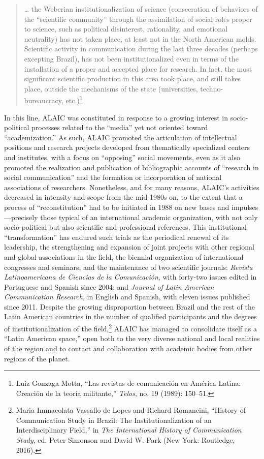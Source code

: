 \documentclass{tufte-handout}
\begin{document}
\begin{quote}
\ldots{} the Weberian institutionalization of science (consecration of
behaviors of the ``scientific community'' through the assimilation of
social roles proper to science, such as political disinterest,
rationality, and emotional neutrality) has not taken place, at least not
in the North American molds. Scientific activity in communication during
the last three decades (perhaps excepting Brazil), has not been
institutionalized even in terms of the installation of a proper and
accepted place for research. In fact, the most significant scientific
production in this area took place, and still takes place, outside the
mechanisms of the state (universities, techno-bureaucracy,
etc.)\footnote{Luiz Gonzaga Motta, ``Las revistas de comunicación en
  América Latina: Creación de la teoría militante,'' \emph{Telos}, no.
  19 (1989): 150--51.}
\end{quote}

\noindent In this line, ALAIC was constituted in response to a growing interest in
socio-political processes related to the ``media'' yet not oriented
toward ``academization.'' As such, ALAIC promoted the articulation of
intellectual positions and research projects developed from thematically
specialized centers and institutes, with a focus on ``opposing'' social
movements, even as it also promoted the realization and publication of
bibliographic accounts of ``research in social communication'' and the
formation or incorporation of national associations of researchers.
Nonetheless, and for many reasons, ALAIC's activities decreased in
intensity and scope from the mid-1980s on, to the extent that a process
of ``reconstitution'' had to be initiated in 1988 on new bases and
impulses---precisely those typical of an international academic
organization, with not only socio-political but also scientific and
professional references. This institutional ``transformation'' has
endured such trials as the periodical renewal of its leadership, the
strengthening and expansion of joint projects with other regional and
global associations in the field, the biennial organization of
international congresses and seminars, and the maintenance of two
scientific journals: \emph{Revista Latinoamericana de Ciencias de la
Comunicación}, with forty-two issues edited in Portuguese and Spanish
since 2004; and \emph{Journal of Latin American Communication Research},
in English and Spanish, with eleven issues published since 2011. Despite
the growing disproportion between Brazil and the rest of the Latin
American countries in the number of qualified participants and the
degrees of institutionalization of the field,\footnote{Maria Immacolata
  Vassallo de Lopes and Richard Romancini, ``History of Communication
  Study in Brazil: The Institutionalization of an Interdisciplinary
  Field,'' in \emph{The International History of Communication Study},
  ed. Peter Simonson and David W. Park (New York: Routledge, 2016).}
ALAIC has managed to consolidate itself as a ``Latin American space,''
open both to the very diverse national and local realities of the region
and to contact and collaboration with academic bodies from other regions
of the planet.
\end{document}
